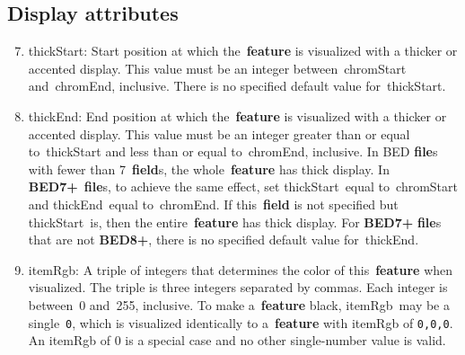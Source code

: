 \documentclass[11pt]{article}
\begin{document}
\subsection{Display attributes}
\begin{enumerate}
  \setcounter{enumi}{6}

\item \textsf{thickStart}: Start position at which the~\textbf{feature} is visualized with a thicker or accented display.
  This value must be an integer between~\textsf{chromStart} and~\textsf{chromEnd}, inclusive.
  There is no specified default value for~\textsf{thickStart}.

\item \textsf{thickEnd}: End position at which the~\textbf{feature} is visualized with a thicker or accented display.
  This value must be an integer greater than or equal to~\textsf{thickStart} and less than or equal to~\textsf{chromEnd}, inclusive.
  In \ac{BED} \textbf{file}s with fewer than 7~\textbf{field}s, the whole~\textbf{feature} has thick display.
  In \textbf{BED7+}~\textbf{file}s, to achieve the same effect, set \textsf{thickStart}~equal to~\textsf{chromStart} and \textsf{thickEnd}~equal to~\textsf{chromEnd}.
  If this~\textbf{field} is not specified but \textsf{thickStart}~is, then the entire~\textbf{feature} has thick display.
  For \textbf{BED7+} \textbf{file}s that are not \textbf{BED8+}, there is no specified default value for~\textsf{thickEnd}.

\item \textsf{itemRgb}: A triple of integers that determines the color of this~\textbf{feature} when visualized.
  The triple is three integers separated by commas.
  Each integer is between~0 and~255, inclusive.
  To make a~\textbf{feature} black, \textsf{itemRgb}~may be a single~\texttt{0}, which is visualized identically to a~\textbf{feature} with \textsf{itemRgb} of \texttt{0,0,0}.
  An \textsf{itemRgb} of 0 is a special case and no other single-number value is valid.
\end{enumerate}
\end{document}
